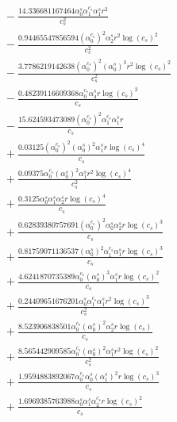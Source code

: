 \documentclass[10pt]{article}
\begin{document}
\begin{align*}
&{}  - \frac{14.336681167464 \alpha_{0}^s \alpha_{1}^{c_s} \alpha_{1}^s r^{2}}{c_{s}^{2}} \\
&{}  - \frac{0.94465547856594 \left(\alpha_{0}^{c_s}\right)^{2} \alpha_{2}^s r^{2} \log{\left(c_{s} \right)}^{2}}{c_{s}^{2}} \\
&{}  - \frac{3.7786219142638 \left(\alpha_{0}^{c_s}\right)^{2} \left(\alpha_{0}^s\right)^{3} r^{2} \log{\left(c_{s} \right)}^{2}}{c_{s}^{2}} \\
&{}  - \frac{0.48239116609368 \alpha_{0}^{c_s} \alpha_{4}^s r \log{\left(c_{s} \right)}^{2}}{c_{s}} \\
&{}  - \frac{15.624593473089 \left(\alpha_{0}^{c_s}\right)^{2} \alpha_{1}^{c_s} \alpha_{1}^s r}{c_{s}} \\
&{}  + \frac{0.03125 \left(\alpha_{0}^{c_s}\right)^{2} \left(\alpha_{0}^s\right)^{2} \alpha_{1}^s r \log{\left(c_{s} \right)}^{4}}{c_{s}} \\
&{}  + \frac{0.09375 \alpha_{0}^{c_s} \left(\alpha_{0}^s\right)^{2} \alpha_{1}^s r^{2} \log{\left(c_{s} \right)}^{4}}{c_{s}^{2}} \\
&{}  + \frac{0.3125 \alpha_{0}^s \alpha_{1}^s \alpha_{2}^s r \log{\left(c_{s} \right)}^{4}}{c_{s}} \\
&{}  + \frac{0.62839380757691 \left(\alpha_{0}^{c_s}\right)^{2} \alpha_{0}^s \alpha_{2}^s r \log{\left(c_{s} \right)}^{3}}{c_{s}} \\
&{}  + \frac{0.81759071136537 \left(\alpha_{0}^s\right)^{2} \alpha_{1}^{c_s} \alpha_{1}^s r \log{\left(c_{s} \right)}^{3}}{c_{s}} \\
&{}  + \frac{4.6241870735389 \alpha_{0}^{c_s} \left(\alpha_{0}^s\right)^{3} \alpha_{1}^s r \log{\left(c_{s} \right)}^{2}}{c_{s}} \\
&{}  + \frac{0.24409651676201 \alpha_{0}^s \alpha_{1}^{c_s} \alpha_{1}^s r^{2} \log{\left(c_{s} \right)}^{3}}{c_{s}^{2}} \\
&{}  + \frac{8.523906838501 \alpha_{0}^{c_s} \left(\alpha_{0}^s\right)^{2} \alpha_{2}^s r \log{\left(c_{s} \right)}}{c_{s}} \\
&{}  + \frac{8.565442909585 \alpha_{0}^{c_s} \left(\alpha_{0}^s\right)^{2} \alpha_{1}^s r^{2} \log{\left(c_{s} \right)}^{2}}{c_{s}^{2}} \\
&{}  + \frac{1.9594883892067 \alpha_{0}^{c_s} \alpha_{0}^s \left(\alpha_{1}^s\right)^{2} r \log{\left(c_{s} \right)}^{3}}{c_{s}} \\
&{}  + \frac{1.6969385763988 \alpha_{0}^s \alpha_{1}^s \alpha_{2}^{c_s} r \log{\left(c_{s} \right)}^{2}}{c_{s}} \\

\end{align*}
\end{document}
